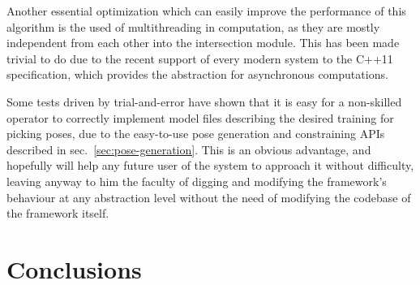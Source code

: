 Another essential optimization which can easily improve the
performance of this algorithm is the used of multithreading in
computation, as they are mostly independent from each other into the
intersection module. This has been made trivial to do due to the
recent support of every modern system to the C++11 specification,
which provides the  abstraction for asynchronous computations.

Some tests driven by trial-and-error have shown that it is easy for a
non-skilled operator to correctly implement model files describing the
desired training for picking poses, due to the easy-to-use pose
generation and constraining APIs described in
sec.~\ref{sec:pose-generation}. This is an obvious advantage, and
hopefully will help any future user of the system to approach it
without difficulty, leaving anyway to him the faculty of digging and
modifying the framework's behaviour at any abstraction level without
the need of modifying the codebase of the framework itself.

\section{Conclusions}
